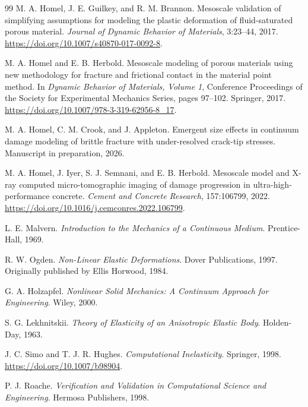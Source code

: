 \begin{thebibliography}{99}
M. A. Homel, J. E. Guilkey, and R. M. Brannon.
\newblock Mesoscale validation of simplifying assumptions for modeling the plastic deformation of fluid-saturated porous material.
\newblock \emph{Journal of Dynamic Behavior of Materials}, 3:23--44, 2017.
\newblock \url{https://doi.org/10.1007/s40870-017-0092-8}.

M. A. Homel and E. B. Herbold.
\newblock Mesoscale modeling of porous materials using new methodology for fracture and frictional contact in the material point method.
\newblock In \emph{Dynamic Behavior of Materials, Volume 1}, Conference Proceedings of the Society for Experimental Mechanics Series, pages 97--102. Springer, 2017.
\newblock \url{https://doi.org/10.1007/978-3-319-62956-8_17}.


M. A. Homel, C. M. Crook, and J. Appleton.
\newblock Emergent size effects in continuum damage modeling of brittle fracture with under-resolved crack-tip stresses.
\newblock Manuscript in preparation, 2026.

M. A. Homel, J. Iyer, S. J. Semnani, and E. B. Herbold.
\newblock Mesoscale model and X-ray computed micro-tomographic imaging of damage progression in ultra-high-performance concrete.
\newblock \emph{Cement and Concrete Research}, 157:106799, 2022.
\newblock \url{https://doi.org/10.1016/j.cemconres.2022.106799}.


L. E. Malvern.
\newblock \emph{Introduction to the Mechanics of a Continuous Medium}.
\newblock Prentice-Hall, 1969.

R. W. Ogden.
\newblock \emph{Non-Linear Elastic Deformations}.
\newblock Dover Publications, 1997.  Originally published by Ellis Horwood, 1984.

G. A. Holzapfel.
\newblock \emph{Nonlinear Solid Mechanics: A Continuum Approach for Engineering}.
\newblock Wiley, 2000.

S. G. Lekhnitskii.
\newblock \emph{Theory of Elasticity of an Anisotropic Elastic Body}.
\newblock Holden-Day, 1963.

J. C. Simo and T. J. R. Hughes.
\newblock \emph{Computational Inelasticity}.
\newblock Springer, 1998.
\newblock \url{https://doi.org/10.1007/b98904}.

P. J. Roache.
\newblock \emph{Verification and Validation in Computational Science and Engineering}.
\newblock Hermosa Publishers, 1998.


\end{thebibliography}
